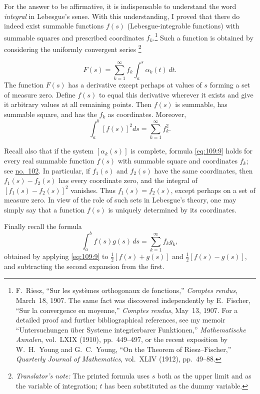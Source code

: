 \documentclass[
  paper=b5,
  fontsize=13pt,
  twoside=true,
  open=any,
  bookmarkpackage=false,
  chapterprefix=true,
  headings=normal
]{scrbook}
\theoremstyle{definition}
\newcounter{translatornote}
\newcommand{\translatornotelabel}{T\arabic{translatornote}}
\newcommand{\translatornote}[1]{%
  \stepcounter{translatornote}%
  \begingroup
    \edef\savedfootnotenumber{\number\value{footnote}}%
    \renewcommand{\thefootnote}{\translatornotelabel}%
    \footnote{\emph{Translator's note:} #1}%
    \setcounter{footnote}{\savedfootnotenumber}%
  \endgroup
}
\begin{document}
For the answer to be affirmative, it is indispensable to understand the word
\emph{integral} in Lebesgue's sense.  With this understanding, I proved that
there do indeed exist summable functions \(f(s)\) (Lebesgue-integrable
functions) with summable squares and prescribed coordinates
\(f_k\).\footnote{F.~Riesz, ``Sur les systèmes orthogonaux de fonctions,''
\emph{Comptes rendus}, March~18, 1907.  The same fact was discovered
independently by E.~Fischer, ``Sur la convergence en moyenne,'' \emph{Comptes
rendus}, May~13, 1907.  For a detailed proof and further bibliographical
references, see my memoir ``Untersuchungen über Systeme integrierbarer
Funktionen,'' \emph{Mathematische Annalen}, vol.~LXIX (1910), pp.~449--497,
or the recent exposition by W.~H.~Young and G.~C.~Young, ``On the Theorem of
Riesz--Fischer,'' \emph{Quarterly Journal of Mathematics}, vol.~XLIV (1912),
pp.~49--88.}
Such a function is obtained by considering the uniformly convergent
series\translatornote{The printed formula uses \(s\) both as the upper limit
and as the variable of integration; \(t\) has been substituted as the dummy
variable.}
\[
  F(s)=\sum_{k=1}^{\infty}f_k\int_a^s\alpha_k(t)\,dt.
\]
The function \(F(s)\) has a derivative except perhaps at values of \(s\)
forming a set of measure zero.  Define \(f(s)\) to equal this derivative
wherever it exists and give it arbitrary values at all remaining points.  Then
\(f(s)\) is summable, has summable square, and has the \(f_k\) as coordinates.
Moreover,
\begin{equation}
  \int_a^b[f(s)]^2ds=\sum_{k=1}^{\infty}f_k^2.
  \tag{9}\label{eq:109:9}
\end{equation}

Recall also that if the system \([\alpha_k(s)]\) is complete, formula
\eqref{eq:109:9} holds for every real summable function \(f(s)\) with
summable square and coordinates \(f_k\); see \hyperref[sec:102]{no.~102}.  In
particular, if \(f_1(s)\) and \(f_2(s)\) have the same coordinates, then
\(f_1(s)-f_2(s)\) has every coordinate zero, and the integral of
\([f_1(s)-f_2(s)]^2\) vanishes.  Thus \(f_1(s)=f_2(s)\), except perhaps on a
set of measure zero.  In view of the role of such sets in Lebesgue's theory,
one may simply say that a function \(f(s)\) is uniquely determined by its
coordinates.

Finally recall the formula
\begin{equation}
  \int_a^b f(s)g(s)\,ds=\sum_{k=1}^{\infty}f_kg_k,
  \tag{10}\label{eq:109:10}
\end{equation}
obtained by applying \eqref{eq:109:9} to
\(\tfrac12[f(s)+g(s)]\) and \(\tfrac12[f(s)-g(s)]\), and subtracting the
second expansion from the first.
\end{document}
